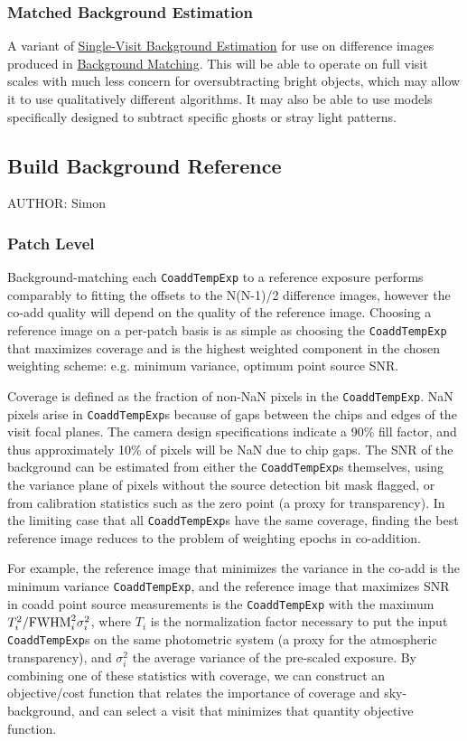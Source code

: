 \subsubsection{Matched Background Estimation}
\label{sec:acMatchedBackgroundEstimation}

A variant of \hyperref[sec:acSingleVisitBackgroundEstimation]{Single-Visit Background Estimation} for use on difference images produced in \hyperref[sec:drpBackgroundMatchAndReject]{Background Matching}.  This will be able to operate on full visit scales with much less concern for oversubtracting bright objects, which may allow it to use qualitatively different algorithms.  It may also be able to use models specifically designed to subtract specific ghosts or stray light patterns.

\subsection{Build Background Reference}
\label{sec:acBuildBackgroundReference}
AUTHOR: Simon
\subsubsection{Patch Level}
Background-matching each \texttt{CoaddTempExp} to a reference exposure performs comparably to fitting
the offsets to the N(N-1)/2 difference images, however the co-add quality will depend on the quality of the
reference image.  Choosing a reference image on a per-patch basis is as simple as choosing the \texttt{CoaddTempExp} that
maximizes coverage and is the highest weighted component in the chosen weighting scheme: e.g. minimum variance, optimum point source SNR. 

Coverage is defined as the fraction of non-NaN
pixels in the \texttt{CoaddTempExp}. NaN pixels arise in \texttt{CoaddTempExp}s because of gaps between the chips and edges of the visit focal
planes.  The camera design specifications indicate a 90\% fill factor, and thus approximately 10\% of pixels
will be NaN due to chip gaps.  The SNR of the background can be estimated from either the \texttt{CoaddTempExp}s themselves,
using the variance plane of pixels without the source detection bit mask flagged, or from calibration
statistics such as the zero point (a proxy for transparency).  In the limiting case that all \texttt{CoaddTempExp}s have the
same coverage, finding the best reference image reduces to the problem of weighting epochs in co-addition.

For example, the reference image that minimizes the variance in the co-add is the minimum variance \texttt{CoaddTempExp}, and
the reference image that maximizes SNR in coadd point source measurements is the \texttt{CoaddTempExp} with the maximum
$T^2_i/{\rm FWHM}^2_i \sigma^2_i$, where $T_i$ is
the normalization factor necessary to put the input \texttt{CoaddTempExp}s on the same photometric system (a proxy for the atmospheric transparency),
and $\sigma^2_i$ the average variance of the pre-scaled exposure.  By combining one of
these statistics with coverage, we can construct an objective/cost function that relates the importance of
coverage and sky-background, and can select a visit that minimizes that quantity objective function.

